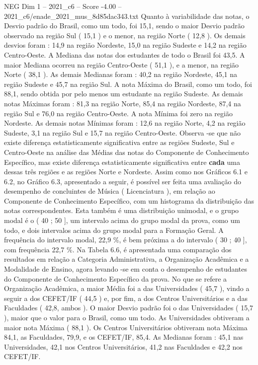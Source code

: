 \begin{textsample}{NEG Dim 1 – 2021\_c6 – Score -4.00 – 2021\_c6/enade\_2021\_mus\_8d85dac343.txt}
Quanto à variabilidade das notas, o Desvio padrão do Brasil, como um todo, foi 15,1, sendo o maior Desvio padrão observado na região Sul ( 15,1 ) e o menor, na região Norte ( 12,8 ).
Os demais desvios foram : 14,9 na região Nordeste, 15,0 na região Sudeste e 14,2 na região Centro-Oeste.
A Mediana das notas dos estudantes de todo o Brasil foi 43,5.
A maior Mediana ocorreu na região Centro-Oeste ( 51,1 ), e a menor, na região Norte ( 38,1 ).
As demais Medianas foram : 40,2 na região Nordeste, 45,1 na região Sudeste e 45,7 na região Sul.
A nota Máxima do Brasil, como um todo, foi 88,1, sendo obtida por pelo menos um estudante na região Sudeste.
As demais notas Máximas foram : 81,3 na região Norte, 85,4 na região Nordeste, 87,4 na região Sul e 76,0 na região Centro-Oeste.
A nota Mínima foi zero na região Nordeste.
As demais notas Mínimas foram : 12,6 na região Norte, 4,2 na região Sudeste, 3,1 na região Sul e 15,7 na região Centro-Oeste.
Observa -se que não existe diferença estatisticamente significativa entre as regiões Sudeste, Sul e Centro-Oeste na análise das Médias das notas do Componente de Conhecimento Específico, mas existe diferença estatisticamente significativa entre \textbf{cada} uma dessas três regiões e as regiões Norte e Nordeste.
Assim como nos Gráficos 6.1 e 6.2, no Gráfico 6.3, apresentado a seguir, é possível ser feita uma avaliação do desempenho de concluintes de Música ( Licenciatura ), em relação ao Componente de Conhecimento Específico, com um histograma da distribuição das notas correspondentes.
Esta também é uma distribuição unimodal, e o grupo modal é o ( 40 ; 50 ], um intervalo acima do grupo modal da prova, como um todo, e dois intervalos acima do grupo modal para a Formação Geral.
A frequência do intervalo modal, 22,9 \%, é bem próxima a do intervalo ( 30 ; 40 ], com frequência 22,7 \%.
Na Tabela 6.6, é apresentada uma comparação dos resultados em relação a Categoria Administrativa, a Organização Acadêmica e a Modalidade de Ensino, agora levando -se em conta o desempenho de estudantes do Componente de Conhecimento Específico da prova.
No que se refere a Organização Acadêmica, a maior Média foi a das Universidades ( 45,7 ), vindo a seguir a dos CEFET/IF ( 44,5 ) e, por fim, a dos Centros Universitários e a das Faculdades ( 42,8, ambos ).
O maior Desvio padrão foi o das Universidades ( 15,7 ), maior que o valor para o Brasil, como um todo.
As Universidades obtiveram a maior nota Máxima ( 88,1 ).
Os Centros Universitários obtiveram nota Máxima 84,1, as Faculdades, 79,9, e os CEFET/IF, 85,4.
As Medianas foram : 45,1 nas Universidades, 42,1 nos Centros Universitários, 41,2 nas Faculdades e 42,2 nos CEFET/IF.

\end{textsample}
